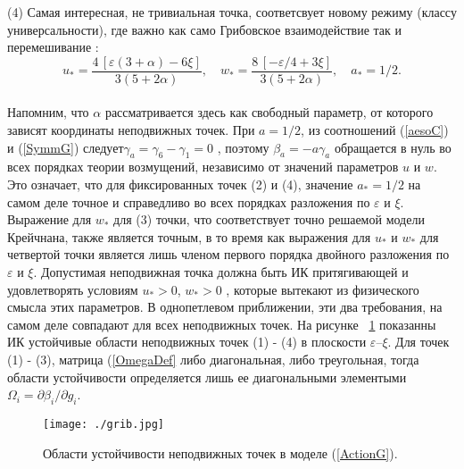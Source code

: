\documentclass[a4paper,10pt]{article}
\begin{document}
(4) Самая интересная, не тривиальная точка, соответсвует новому режиму (классу универсальности), где важно как само Грибовское взаимодействие так и перемешивание :
\begin{equation}
u_{*} = \frac{4\,[\varepsilon(3+\alpha)-6\xi]}{3(5+2\alpha)}, \quad
w_{*} = \frac{8\,[-\varepsilon/4+3\xi]}{3(5+2\alpha)}, \quad a_{*}=1/2.
\label{wu4}
\end{equation}
\\
Напомним, что  $\alpha$ рассматривается здесь как свободный параметр, от которого зависят координаты неподвижных точек.
При $a=1/2$, из соотношений (\ref{aesoC}) и (\ref{SymmG}) следует$\gamma_{a} = \gamma_{6}-\gamma_{1}=0$ , поэтому $\beta_{a} =-a \gamma_{a}$
 обращается в нуль во всех порядках теории возмущений, независимо от значений параметров $u$ и $w$.
Это означает, что для фиксированных точек (2) и (4), значение $a_{*}=1/2$ на самом деле точное и справедливо во всех порядках разложения по $\varepsilon$ и $\xi$.
Выражение для $w_{*}$ для (3) точки, что соответствует точно решаемой модели Крейчнана, также является точным, в то время как выражения для $u_{*}$ и $w_{*}$ 
для четвертой точки является лишь членом первого порядка двойного разложения по $\varepsilon$ и $\xi$.
Допустимая неподвижная точка должна быть ИК притягивающей и удовлетворять условиям $u_{*}>0$, $w_{*}>0$ ,
 которые вытекают из физического смысла этих параметров.
В однопетлевом приближении, эти два требования, на самом деле совпадают для всех неподвижных точек.
На рисунке ~\ref{fig:patt} показанны  ИК устойчивые области неподвижных точек (1) - (4) в плоскости $\varepsilon$--$\xi$.
Для точек (1) - (3), матрица (\ref{OmegaDef} либо диагональная, либо треугольная, тогда области устойчивости определяется лишь ее диагональными 
элементыми $\Omega_{i} = \partial\beta_{i}/\partial g_{i}$.

\begin{figure}[H]
\begin{center}
\texttt{[image: ./grib.jpg]}
\caption{\label{fig:patt}
Области устойчивости неподвижных точек в моделе
 (\protect\ref{ActionG}).}
\end{center}
\end{figure}
\end{document}
